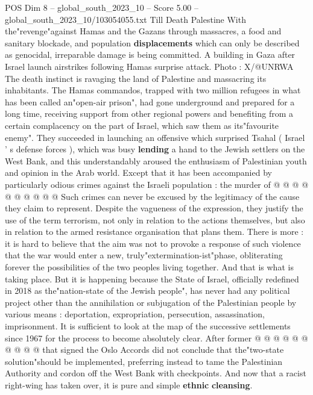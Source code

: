 \begin{textsample}{POS Dim 8 – global\_south\_2023\_10 – Score 5.00 – global\_south\_2023\_10/103054055.txt}  \label{ex:f8_pos_352}
Till Death Palestine With the"revenge"against Hamas and the Gazans through massacres, a food and sanitary blockade, and population \textbf{displacements} which can only be described as genocidal, irreparable damage is being committed.
A building in Gaza after Israel launch airstrikes following Hamas surprise attack.
Photo : X/@UNRWA The death instinct is ravaging the land of Palestine and massacring its inhabitants.
The Hamas commandos, trapped with two million refugees in what has been called an"open-air prison", had gone underground and prepared for a long time, receiving support from other regional powers and benefiting from a certain complacency on the part of Israel, which saw them as its"favourite enemy".
They succeeded in launching an offensive which surprised Tsahal ( Israel ' s defense forces ), which was busy \textbf{lending} a hand to the Jewish settlers on the West Bank, and this understandably aroused the enthusiasm of Palestinian youth and opinion in the Arab world.
Except that it has been accompanied by particularly odious crimes against the Israeli population : the murder of @ @ @ @ @ @ @ @ @ @ Such crimes can never be excused by the legitimacy of the cause they claim to represent.
Despite the vagueness of the expression, they justify the use of the term terrorism, not only in relation to the actions themselves, but also in relation to the armed resistance organisation that plans them.
There is more : it is hard to believe that the aim was not to provoke a response of such violence that the war would enter a new, truly"extermination-ist"phase, obliterating forever the possibilities of the two peoples living together.
And that is what is taking place.
But it is happening because the State of Israel, officially redefined in 2018 as the"nation-state of the Jewish people", has never had any political project other than the annihilation or subjugation of the Palestinian people by various means : deportation, expropriation, persecution, assassination, imprisonment.
It is sufficient to look at the map of the successive settlements since 1967 for the process to become absolutely clear.
After former @ @ @ @ @ @ @ @ @ @ that signed the Oslo Accords did not conclude that the"two-state solution"should be implemented, preferring instead to tame the Palestinian Authority and cordon off the West Bank with checkpoints.
And now that a racist right-wing has taken over, it is pure and simple \textbf{ethnic} \textbf{cleansing}.

\end{textsample}
